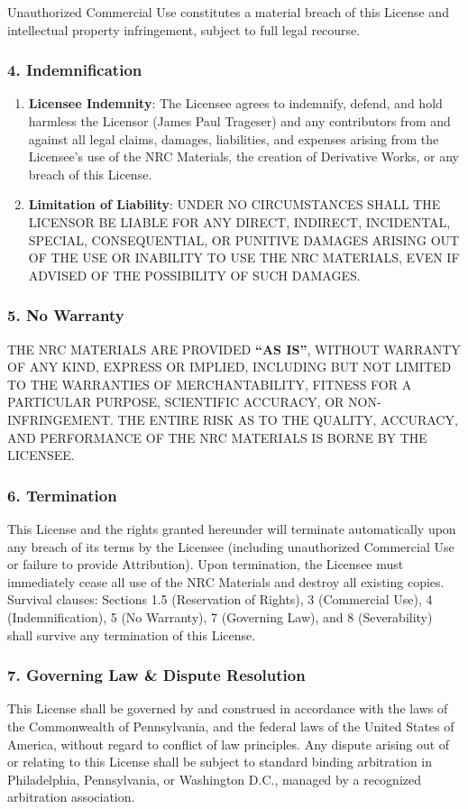 \documentclass[11pt,a4paper,oneside]{article}
\begin{document}
	Unauthorized Commercial Use constitutes a material breach of this License and intellectual property infringement, subject to full legal recourse.

	\subsubsection*{4. Indemnification}
	\begin{enumerate}
		\item \textbf{Licensee Indemnity}: The Licensee agrees to indemnify, defend, and hold harmless the Licensor (James Paul Trageser) and any contributors from and against all legal claims, damages, liabilities, and expenses arising from the Licensee’s use of the NRC Materials, the creation of Derivative Works, or any breach of this License.
		\item \textbf{Limitation of Liability}: UNDER NO CIRCUMSTANCES SHALL THE LICENSOR BE LIABLE FOR ANY DIRECT, INDIRECT, INCIDENTAL, SPECIAL, CONSEQUENTIAL, OR PUNITIVE DAMAGES ARISING OUT OF THE USE OR INABILITY TO USE THE NRC MATERIALS, EVEN IF ADVISED OF THE POSSIBILITY OF SUCH DAMAGES.
	\end{enumerate}

	\subsubsection*{5. No Warranty}
	THE NRC MATERIALS ARE PROVIDED \textbf{``AS IS''}, WITHOUT WARRANTY OF ANY KIND, EXPRESS OR IMPLIED, INCLUDING BUT NOT LIMITED TO THE WARRANTIES OF MERCHANTABILITY, FITNESS FOR A PARTICULAR PURPOSE, SCIENTIFIC ACCURACY, OR NON-INFRINGEMENT. THE ENTIRE RISK AS TO THE QUALITY, ACCURACY, AND PERFORMANCE OF THE NRC MATERIALS IS BORNE BY THE LICENSEE.

	\subsubsection*{6. Termination}
	This License and the rights granted hereunder will terminate automatically upon any breach of its terms by the Licensee (including unauthorized Commercial Use or failure to provide Attribution). Upon termination, the Licensee must immediately cease all use of the NRC Materials and destroy all existing copies. Survival clauses: Sections 1.5 (Reservation of Rights), 3 (Commercial Use), 4 (Indemnification), 5 (No Warranty), 7 (Governing Law), and 8 (Severability) shall survive any termination of this License.

	\subsubsection*{7. Governing Law \& Dispute Resolution}
	This License shall be governed by and construed in accordance with the laws of the Commonwealth of Pennsylvania, and the federal laws of the United States of America, without regard to conflict of law principles. Any dispute arising out of or relating to this License shall be subject to standard binding arbitration in Philadelphia, Pennsylvania, or Washington D.C., managed by a recognized arbitration association.
\end{document}
